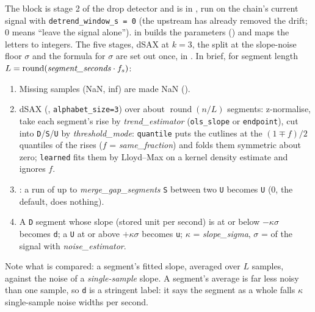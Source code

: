 The block is stage 2 of the drop detector and is  in
, run on the chain's current signal with
\texttt{detrend\_window\_s = 0} (the upstream  has already
removed the drift; 0 means ``leave the signal alone'').  in
 builds the parameters () and
maps the letters to integers. The five stages, dSAX at $k=3$, the split at the slope-noise
floor $\sigma$ and the formula for $\sigma$ are set out once, in
. In brief, for segment length
$L = \operatorname{round}(\text{\emph{segment\_seconds}}\cdot f_s)$:
\begin{enumerate}
\item Missing samples (NaN, inf) are made NaN ().
\item dSAX (, \texttt{alphabet\_size=3}) over about $\operatorname{round}(n/L)$
  segments: z-normalise, take each segment's rise by \emph{trend\_estimator}
  (\texttt{ols\_slope} or \texttt{endpoint}), cut into \texttt{D}/\texttt{S}/\texttt{U} by
  \emph{threshold\_mode}: \texttt{quantile} puts the cutlines at the $(1\mp f)/2$ quantiles of
  the rises ($f$ = \emph{same\_fraction}) and folds them symmetric about zero;
  \texttt{learned} fits them by Lloyd--Max on a kernel density estimate and ignores $f$.
\item {}: a run of up to \emph{merge\_gap\_segments} \texttt{S} between two
  \texttt{U} becomes \texttt{U} (0, the default, does nothing).
\item A \texttt{D} segment whose slope (stored unit per second) is at or below
  $-\kappa\sigma$ becomes \texttt{d}; a \texttt{U} at or above $+\kappa\sigma$ becomes
  \texttt{u}; $\kappa$ = \emph{slope\_sigma}, $\sigma$ =  of the
  signal with \emph{noise\_estimator}.
\end{enumerate}
Note what is compared: a segment's fitted slope, averaged over $L$ samples, against the noise
of a \emph{single-sample} slope. A segment's average is far less noisy than one sample, so
\texttt{d} is a stringent label: it says the segment as a whole falls $\kappa$ single-sample
noise widths per second.

